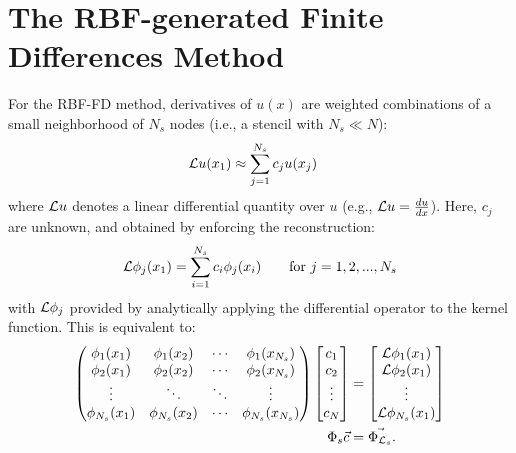 \documentclass{report}
\begin{document}
{\section{The RBF-generated Finite Differences Method}


For the RBF-FD method, derivatives of $u(x)$ are weighted combinations of a small neighborhood of $N_s$ nodes (i.e., a stencil with $N_s \ll N$):
        \begin{align} 
        \mathcal{L}u(x_1) &\approx \sum_{j=1}^{N_s} c_j u(x_j) \nonumber 
        \label{eq:derivFromFDWeights}
        \end{align}
where $\mathcal{L}u$ denotes a linear differential quantity over $u$ (e.g., $\mathcal{L}u = \frac{d u}{d x}$). Here, ${c_j}$ are unknown, and obtained by enforcing the reconstruction:
	\begin{align}
	        \mathcal{L}\phi_j(x_1) = \sum_{i=1}^{N_s} c_i \phi_j(x_i) \ \ \ \ \ \ \textrm{for }j=1,2,...,N_s \nonumber 
	\end{align}
with $\mathcal{L}\phi_j$ provided by analytically applying the differential operator to the kernel function.
This is equivalent to: 
	\begin{align}        
          \begin{pmatrix}  
            \phi_1(x_1) & \phi_1(x_2) & \cdots & \phi_1(x_{N_s}) \\ 
            \phi_2(x_1) & \phi_2(x_2) & \cdots & \phi_2(x_{N_s}) \\ 
            \vdots & \ddots & \ddots & \vdots \\
            \phi_{N_s}(x_1) & \phi_{N_s}(x_2) & \cdots & \phi_{N_s}(x_{N_s})
                \end{pmatrix} 
                \begin{bmatrix} c_1 \\ c_2 \\ \vdots \\ c_N \end{bmatrix}
               &=                \begin{bmatrix} \diffop{\phi_1}(x_1) \\  \diffop{\phi_2}(x_1) \\ \vdots \\  \diffop{\phi_{N_s}}(x_1) 
               \end{bmatrix} \\
                         \Phi_{s} \vec{c} &= \vec{\Phi_{\diffop{}_s}}.%

\end{align}}
\end{document}
